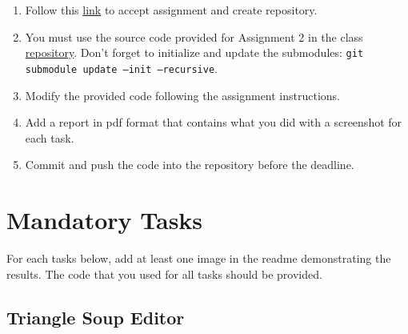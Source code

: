 \documentclass[11pt]{article}
\begin{document}

\begin{enumerate}
\item Follow this \href{https://classroom.github.com/a/5oSFFk4y}{link} to accept assignment and create repository.
\item You must use the source code provided for Assignment 2 in the class \href{https://github.com/nyu-cs-gy-6533-fall-2020/base}{repository}. Don't forget to initialize and update the submodules: \texttt{git submodule update --init --recursive}.
\item Modify the provided code following the assignment instructions.
\item Add a report in pdf format that contains what you did with a screenshot for each task.
\item Commit and push the code into the repository before the deadline.
\end{enumerate}


\section{Mandatory Tasks}
For each tasks below, add at least one image in the readme demonstrating the results. The code that you used for all tasks should be provided.

\subsection{Triangle Soup Editor}
\end{document}
